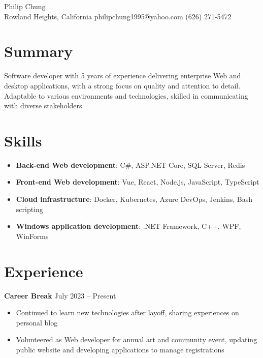 \documentclass[12pt]{article}
\newcommand{\titleheader}[2]{\textbf{#1} \symbol{"B7} #2}
\begin{document}
	\begin{center}
		{\headerfont\fontsize{24pt}{24pt}\selectfont Philip Chung} \\ \vspace{0.5em}
		Rowland Heights, California  philipchung1995@yahoo.com  (626) 271-5472
	\end{center}

	\section*{Summary}

	Software developer with 5 years of experience delivering enterprise Web and desktop applications, with a strong focus on quality and attention to detail. Adaptable to various environments and technologies, skilled in communicating with diverse stakeholders.

	\section*{Skills}

	\newcommand{\skillitem}[2]{\item \textbf{#1}: #2}

	\begin{itemize}[left=0.25in .. 0.25in,label={},itemindent=-0.25in]
		\skillitem{Back-end Web development}{C\#, ASP.NET Core, SQL Server, Redis}
		\skillitem{Front-end Web development}{Vue, React, Node.js, JavaScript, TypeScript}
		\skillitem{Cloud infrastructure}{Docker, Kubernetes, Azure DevOps, Jenkins, Bash scripting}
		\skillitem{Windows application development}{.NET Framework, C++, WPF, WinForms}
	\end{itemize}

	\section*{Experience}

	\titleheader{Career Break}{July 2023 -- Present}

	\begin{itemize}
		\item Continued to learn new technologies after layoff, sharing experiences on personal blog
		\item Volunteered as Web developer for annual art and community event, updating public website and developing applications to manage registrations
	\end{itemize}
\end{document}
